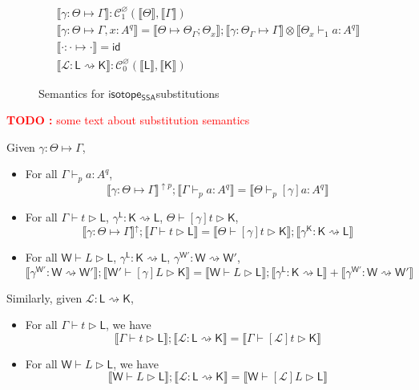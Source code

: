\documentclass[acmsmall,screen,review]{acmart}
\newcounter{todos}
\newcommand{\TODO}[1]{{
  \stepcounter{todos}
  \begin{center}\large{\textcolor{red}{\textbf{TODO \arabic{todos}:} #1}}\end{center}
}}
\newcommand{\mc}[1]{\ensuremath{\mathcal{#1}}}
\newcommand{\ms}[1]{\ensuremath{\mathsf{#1}}}
\newcommand{\csplits}[3]{#1 \mapsto #2;#3}
\newcommand{\thyp}[3]{#1: {#2}^{#3}}
\newcommand{\hasty}[5]{#1 \vdash_{#2} #3: {#4}^{#5}}
\newcommand{\haslb}[3]{#1 \vdash #2 \rhd #3}
\newcommand{\lhaslb}[3]{#1 \vdash #2 \rhd #3}
\newcommand{\issubst}[3]{#1: #2 \mapsto #3}
\newcommand{\lbsubst}[3]{#1: #2 \rightsquigarrow #3}
\newcommand{\substlbs}[2]{{#1}^{#2}}
\newcommand{\dnt}[1]{\llbracket{#1}\rrbracket}
\newcommand{\upg}[2]{{#1}^{\uparrow #2}}
\newcommand{\isotopessa}{\ms{isotope_{SSA}}}
\begin{document}
\begin{figure}
  \begin{gather*}
    \boxed{\dnt{\issubst{\gamma}{\Theta}{\Gamma}}: \mc{C}_1^\varnothing(\dnt{\Theta}, \dnt{\Gamma})} 
    \\
    \dnt{\issubst{\gamma}{\Theta}{\Gamma, \thyp{x}{A}{q}}}
      = \dnt{\csplits{\Theta}{\Theta_\Gamma}{\Theta_x}};\dnt{\issubst{\gamma}{\Theta_\Gamma}{\Gamma}} \otimes \dnt{\hasty{\Theta_x}{1}{a}{A}{q}} \\
    \dnt{\issubst{\cdot}{\cdot}{\cdot}} = \ms{id}
    \\
    \boxed{\dnt{\lbsubst{\mc{L}}{\ms{L}}{\ms{K}}}: \mc{C}_0^\varnothing(\dnt{\ms{L}}, \dnt{\ms{K}})} 
  \end{gather*}
  \caption{Semantics for \isotopessa substitutions}
  \label{fig:ssa-subst-semantics}
\end{figure}

\TODO{some text about substitution semantics}

\begin{theorem} 
  Given \(\issubst{\gamma}{\Theta}{\Gamma}\),
  \begin{itemize}
    \item For all \(\hasty{\Gamma}{p}{a}{A}{q}\), 
    \[
      \upg{\dnt{\issubst{\gamma}{\Theta}{\Gamma}}}{p}
      ;\dnt{\hasty{\Gamma}{p}{a}{A}{q}} 
      = \dnt{\hasty{\Theta}{p}{[\gamma]a}{A}{q}}
    \]
    \item For all 
      \(\haslb{\Gamma}{t}{\ms{L}}\), 
      \(\lbsubst{\substlbs{\gamma}{\ms{L}}}{\ms{K}}{\ms{L}}\), 
      \(\haslb{\Theta}{[\gamma]t}{\ms{K}}\),
    \[
      \upg{\dnt{\issubst{\gamma}{\Theta}{\Gamma}}}{}
      ; \dnt{\haslb{\Gamma}{t}{\ms{L}}}
      = \dnt{\haslb{\Theta}{[\gamma]t}{\ms{K}}} 
      ; \dnt{\lbsubst{\substlbs{\gamma}{\ms{K}}}{\ms{K}}{\ms{L}}}
    \]
    \item For all 
      \(\lhaslb{\ms{W}}{L}{\ms{L}}\), 
      \(\lbsubst{\substlbs{\gamma}{\ms{L}}}{\ms{K}}{\ms{L}}\),
      \(\lbsubst{\substlbs{\gamma}{\ms{W'}}}{\ms{W}}{\ms{W'}}\),
      \[
        \dnt{\lbsubst{\substlbs{\gamma}{\ms{W'}}}{\ms{W}}{\ms{W'}}}
        ; \dnt{\lhaslb{\ms{W'}}{[\gamma]L}{\ms{K}}}
        = \dnt{\lhaslb{\ms{W}}{L}{\ms{L}}}
        ; \dnt{\lbsubst{\substlbs{\gamma}{\ms{L}}}{\ms{K}}{\ms{L}}}
        + \dnt{\lbsubst{\substlbs{\gamma}{\ms{W'}}}{\ms{W}}{\ms{W'}}}
      \]
  \end{itemize}
  Similarly, given \(\lbsubst{\mc{L}}{\ms{L}}{\ms{K}}\),
  \begin{itemize} 
    \item For all \(\haslb{\Gamma}{t}{\ms{L}}\), we have
    \[
      \dnt{\haslb{\Gamma}{t}{\ms{L}}};\dnt{\lbsubst{\mc{L}}{\ms{L}}{\ms{K}}}
      = \dnt{\haslb{\Gamma}{[\mc{L}]t}{\ms{K}}}
    \]
    \item For all \(\lhaslb{\ms{W}}{L}{\ms{L}}\), we have
    \[
      \dnt{\lhaslb{\ms{W}}{L}{\ms{L}}};\dnt{\lbsubst{\mc{L}}{\ms{L}}{\ms{K}}}
      = \dnt{\lhaslb{\ms{W}}{[\mc{L}]L}{\ms{L}}}
    \]
  \end{itemize}
\end{theorem}
\end{document}
